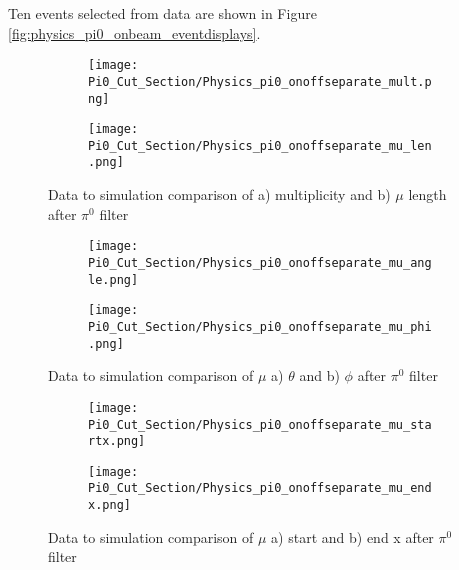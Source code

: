\documentclass{article}
\begin{document}


Ten events selected from data are shown in Figure \ref{fig:physics_pi0_onbeam_eventdisplays}.

\begin{figure}[h!]
\centering
  \begin{subfigure}[t]{0.3\textwidth}
    \centering
\texttt{[image: Pi0\_Cut\_Section/Physics\_pi0\_onoffseparate\_mult.png]}
  \caption{ }
  \end{subfigure} 
  \hspace{10mm}
  \begin{subfigure}[t]{0.3\textwidth}
    \centering
    \texttt{[image: Pi0\_Cut\_Section/Physics\_pi0\_onoffseparate\_mu\_len.png]}
  \caption{ }
  \end{subfigure} 
  \caption{ Data to simulation comparison of a) multiplicity and b) $\mu$ length after $\pi^0$ filter }
\label{fig:physics_pi0_mu_len}
\end{figure}

\begin{figure}[h!]
\centering
  \begin{subfigure}[t]{0.3\textwidth}
    \centering
\texttt{[image: Pi0\_Cut\_Section/Physics\_pi0\_onoffseparate\_mu\_angle.png]}
  \caption{ }
  \end{subfigure} 
  \hspace{10mm}
  \begin{subfigure}[t]{0.3\textwidth}
    \centering
\texttt{[image: Pi0\_Cut\_Section/Physics\_pi0\_onoffseparate\_mu\_phi.png]}
  \caption{ }
  \end{subfigure} 
\caption{ Data to simulation comparison of $\mu$ a) $\theta$ and b) $\phi$ after $\pi^0$ filter }

\label{fig:physics_pi0_mu_phi}
\end{figure}

\begin{figure}[t!]
\centering
  \begin{subfigure}[t]{0.3\textwidth}
    \centering
\texttt{[image: Pi0\_Cut\_Section/Physics\_pi0\_onoffseparate\_mu\_startx.png]}
  \caption{ }
  \end{subfigure} 
  \hspace{30mm}
  \begin{subfigure}[t]{0.3\textwidth}
    \centering
\texttt{[image: Pi0\_Cut\_Section/Physics\_pi0\_onoffseparate\_mu\_endx.png]}
  \caption{ }
  \end{subfigure} 
\caption{ Data to simulation comparison of $\mu$ a) start and b) end x after $\pi^0$ filter }
\label{fig:physics_pi0_mu_x}
\end{figure}
\end{document}
